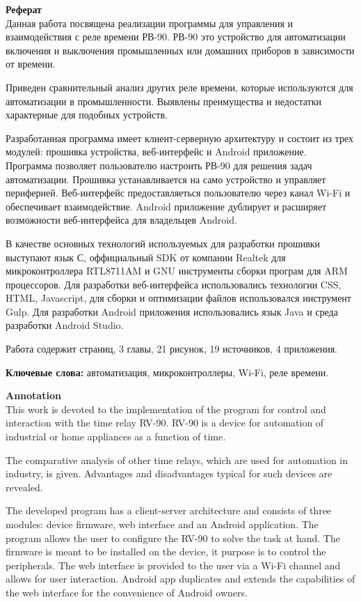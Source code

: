 \textbf{\Large Реферат} \\

Данная работа посвящена реализации программы для управления и взаимодействия с реле времени РВ-90. РВ-90 это устройство для автоматизации включения и выключения промышленных или домашних приборов в зависимости от времени.

Приведен сравнительный анализ других реле времени, которые используются для автоматизации в промышленности. Выявлены преимущества и недостатки характерные для подобных устройств.

Разработанная программа имеет клиент-серверную архитектуру и состоит из трех модулей: прошивка устройства, веб-интерфейс и Android приложение. Программа позволяет пользователю настроить РВ-90 для решения задач автоматизации. Прошивка устанавливается на само устройство и управляет периферией. Веб-интерфейс предоставляеться пользователю через канал Wi-Fi и обеспечивает взаимодействие. Android приложение дублирует и расширяет возможности веб-интерфейса для владельцев Android.

В качестве основных технологий используемых для разработки прошивки выступают язык С, оффициальный SDK от компании Realtek для микроконтроллера RTL8711AM и GNU инструменты сборки програм для ARM процессоров. Для разработки веб-интерфейса использовались технологии CSS, HTML, Javascript, для сборки и оптимизации файлов использовался инструмент Gulp. Для разработки Android приложения использовались язык Java и среда разработки Android Studio.

Работа содержит \pageref{LastPage} страниц, 3 главы, 21 рисунок, 19 источников, 4 приложения.

\textbf{Ключевые слова:} автоматизация,  микроконтроллеры, Wi-Fi, реле времени.

\newpage

\textbf{\Large Annotation} \\

This work is devoted to the implementation of the program for control and interaction with the time relay RV-90. RV-90 is a device for automation of industrial or home appliances as a function of time.

The comparative analysis of other time relays, which are used for automation in industry, is given. Advantages and disadvantages typical for such devices are revealed.

The developed program has a client-server architecture and consists of three modules: device firmware, web interface and an Android application. The program allows the user to configure the RV-90 to solve the task at hand. The firmware is meant to be installed on the device, it purpose is to control the peripherals. The web interface is provided to the user via a Wi-Fi channel and allows for user interaction. Android app duplicates and extends the capabilities of the web interface for the convenience of Android owners.


